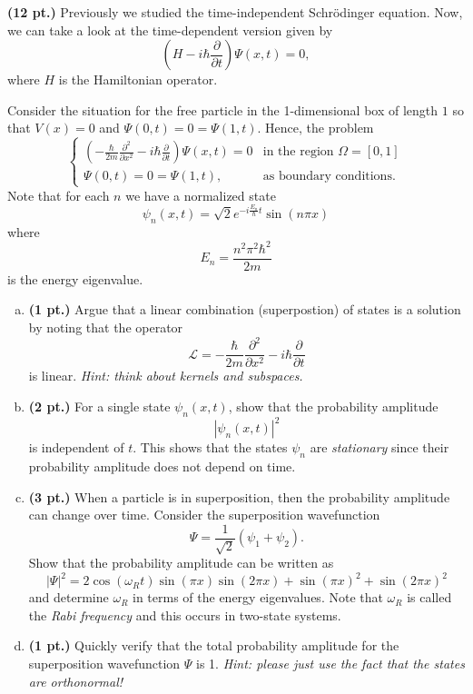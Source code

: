 \documentclass[12pt]{article} %
\begin{document}
\newpage
\begin{problem}
\textbf{(12 pt.)} Previously we studied the time-independent Schr\"odinger equation. Now, we can take a look at the time-dependent version given by
\[
\left( H - i\hbar \frac{\partial}{\partial t} \right) \Psi(x,t) = 0,
\]
where $H$ is the Hamiltonian operator.  

Consider the situation for the free particle in the 1-dimensional box of length $1$ so that $V(x)=0$ and $\Psi(0,t)=0=\Psi(1,t)$. Hence, the problem
\[
\begin{cases}
\left( -\frac{\hbar}{2m} \frac{\partial ^2}{\partial x^2} - i\hbar \frac{\partial}{\partial t} \right) \Psi(x,t) = 0 & \textrm{in the region $\Omega = [0,1]$}\\
\Psi(0,t)=0=\Psi(1,t), & \textrm{as boundary conditions}.
\end{cases}
\]
Note that for each $n$ we have a normalized state
\[
\psi_n(x,t) = \sqrt{2} e^{-i \frac{E_n}{\hbar} t} \sin(n \pi x)
\]
where 
\[
E_n = \frac{n^2 \pi^2 \hbar^2}{2m}
\]
is the energy eigenvalue.
\begin{enumerate}[(a)]
    \item \textbf{(1 pt.)} Argue that a linear combination (superpostion) of states is a solution by noting that the operator
	\[
	\mathcal{L} = -\frac{\hbar}{2m} \frac{\partial ^2}{\partial x^2} - i\hbar \frac{\partial}{\partial t}
	\]
	is linear. \emph{Hint: think about kernels and subspaces.}
    \item \textbf{(2 pt.)} For a single state $\psi_n(x,t)$, show that the probability amplitude
    \[
\left|\psi_n(x,t)\right|^2
    \]
    is independent of $t$. This shows that the states $\psi_n$ are \emph{stationary} since their probability amplitude does not depend on time.
	\item \textbf{(3 pt.)} When a particle is in superposition, then the probability amplitude can change over time. Consider the superposition wavefunction
	\[
	\Psi = \frac{1}{\sqrt{2}} \left( \psi_1 + \psi_2 \right).
	\]
	Show that the probability amplitude can be written as
	\[
	|\Psi|^2 = 2 \cos(\omega_R t)\sin(\pi x)\sin(2\pi x)+ \sin(\pi x)^2 +\sin(2\pi x)^2
	\]
	and determine $\omega_R$ in terms of the energy eigenvalues. Note that $\omega_R$ is called the \emph{Rabi frequency} and this occurs in two-state systems.
	\item \textbf{(1 pt.)} Quickly verify that the total probability amplitude for the superposition wavefunction $\Psi$ is 1. \emph{Hint: please just use the fact that the states are orthonormal!}

\end{enumerate}
\end{problem}
\end{document}
